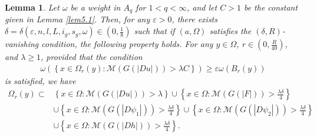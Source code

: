 \documentclass[10pt,a4paper]{article}
\newtheorem{lemma}[theorem]{Lemma}
\theoremstyle{definition}
\numberwithin{equation}{section}
\begin{document}
 
 \begin{lemma}\label{cor5.2}
 	Let $\omega$ be a weight in $A_q$ for $1<q<\infty$, and let $C>1$ be the constant given in Lemma \ref{lem5.1}. Then, for any $\varepsilon>0$, there exists 
 	$
 	\delta=\delta(\varepsilon,n,l,L,i_g,s_g,\omega)
 	\in\left(0,\frac18\right)
 	$ 
 	such that if $(a,\Omega)$ satisfies the $(\delta,R)$-vanishing condition, the following property holds. For any $y\in\Omega$, $r\in(0,\frac{R}{40})$, and $\lambda\geq1$, provided that the condition
 	\begin{align}\label{5.10}
 		\omega
 		\left(
 		\left\{
 		x\in\Omega_r(y):
 		\mathcal{M}(G(|Du|))>\lambda C
 		\right\}
 		\right)
 		\geq
 		\varepsilon\omega(B_r(y))
 	\end{align}
 	is satisfied, we have  
 	\begin{align}\label{5.11}
 		\Omega_r(y)
 		\subset&
 		\left\{
 		x\in\Omega:
 		\mathcal{M}(G(|Du|))>\lambda
 		\right\}
 		\cup
 		\left\{
 		x\in\Omega:
 		\mathcal{M}(G(|F|))>\frac{\lambda\delta}{4}
 		\right\}
 		\nonumber\\
 		&\cup
 		\left\{
 		x\in\Omega:
 		\mathcal{M}(G(|D\psi_1|))>\frac{\lambda\delta}{4}
 		\right\} 	 \cup
 		\left\{
 		x\in\Omega:
 		\mathcal{M}(G(|D\psi_2|))>\frac{\lambda\delta}{4}
 		\right\} 	\nonumber\\
 		&\cup
 		\left\{
 		x\in\Omega:
 		\mathcal{M}(G(|Dh|))>\frac{\lambda\delta}{4}
 		\right\}. 
 	\end{align}
 \end{lemma}
 
\end{document}
